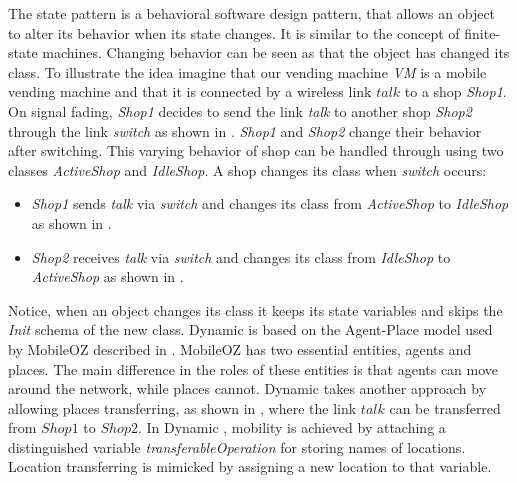 The state pattern \cite{erichgamma1994} is a behavioral software design pattern, that allows an object to alter its behavior when its state changes. It is similar to the concept of finite-state machines. Changing behavior can be seen as that the object has changed its class. To illustrate the idea imagine that our vending machine \textit{VM} is a mobile vending machine and that it is connected by a wireless link $talk$ to a shop \textit{Shop1}. On signal fading, \textit{Shop1} decides to send the link \textit{talk} to another shop \textit{Shop2} through the link \textit{switch} as shown in . \textit{Shop1} and \textit{Shop2} change their behavior after switching. This varying behavior of shop can be handled through using two classes \textit{ActiveShop} and \textit{IdleShop}. A shop changes its class when \textit{switch} occurs:
\begin{itemize}
\item \textit{Shop1} sends \textit{talk} via \textit{switch} and changes its class from \textit{ActiveShop} to \textit{IdleShop} as shown in .
\item \textit{Shop2} receives \textit{talk} via  \textit{switch} and changes its class from \textit{IdleShop} to \textit{ActiveShop} as shown in .
\end{itemize}
Notice, when an object changes its class it keeps its state variables and skips the \textit{Init} schema of the new class.
Dynamic \oz{} is based on the Agent-Place model used by MobileOZ described in \cite{Kenji2}. MobileOZ has two
essential entities, agents and places. The main difference in the roles of these entities is that agents can move around the network, while places cannot. Dynamic \oz{} takes another approach by allowing places transferring, as shown in , where the link $talk$ can be transferred from $Shop1$ to $Shop2$. In Dynamic \oz{}, mobility is achieved
by attaching a distinguished variable \emph{transferableOperation} for storing names of locations. Location transferring
is mimicked by assigning a new location to that variable.


